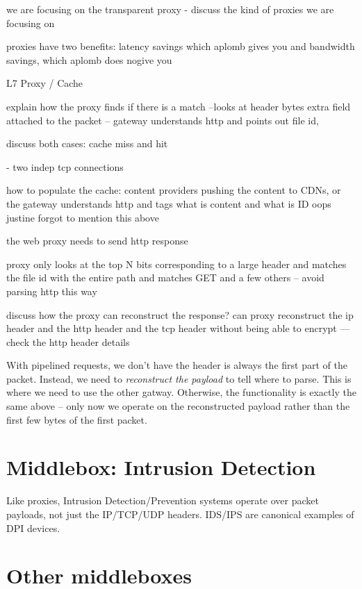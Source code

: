 we are focusing on the transparent proxy
- discuss the kind of proxies we are focusing on

proxies have two benefits: latency savings which aplomb gives you 
and bandwidth savings, which aplomb does nogive you
 
L7 Proxy / Cache

explain how the proxy finds if there is  a match --looks at header bytes
extra field attached to the packet -- gateway understands http and points out file id, 

discuss both cases: cache miss and hit

- two indep tcp connections 

how to populate the cache: content providers pushing the content to CDNs, or the gateway understands
http and tags what is content and what is ID
oops justine forgot to mention this above

the web proxy needs to send http response 

proxy only looks at the top N bits corresponding to a large header and matches the file id with the entire path
and matches GET and a few others -- avoid parsing http this way


discuss how the proxy can reconstruct the response?
can proxy reconstruct the ip header and the http header  and the tcp header without being able to encrypt
--- check the http header details

With pipelined requests, we don't have the header is always the first part of the packet. Instead, we need to {\it reconstruct the payload} to tell where to parse. This is where we need to use the other gatway. Otherwise, the functionality is exactly the same above -- only now we operate on the reconstructed payload rather than the first few bytes of the first packet.


\section{Middlebox: Intrusion Detection}
Like proxies, Intrusion Detection/Prevention systems operate over packet payloads, not just the IP/TCP/UDP headers.
IDS/IPS are canonical examples of DPI devices.


\section{Other middleboxes}\label{sec:vpn} \label{sec:other_apps} \label{sec:not_supp}\label{sec:loadb}


